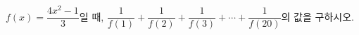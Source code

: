 $f(x)=\dfrac{4x^2-1}{3}$일 때, $\dfrac{1}{f(1)}+\dfrac{1}{f(2)}+\dfrac{1}{f(3)}+\cdots+\dfrac{1}{f(20)}$의 값을 구하시오.
